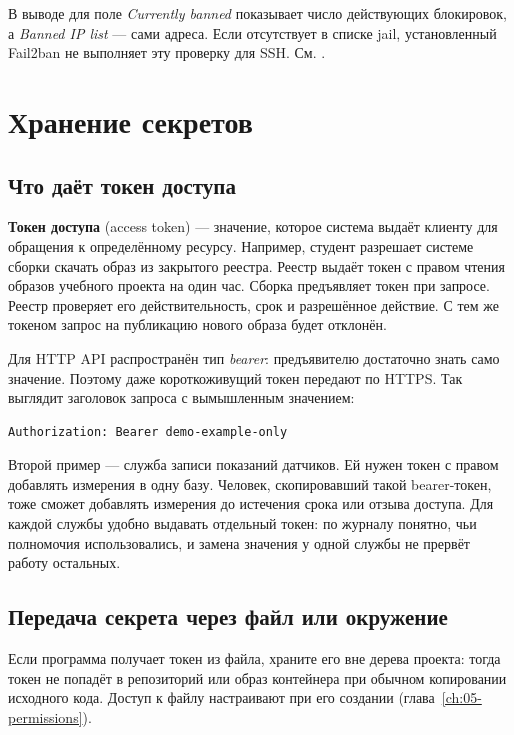 В выводе для  поле \emph{Currently banned} показывает число
действующих блокировок, а \emph{Banned IP list} --- сами адреса.
Если  отсутствует в списке jail, установленный Fail2ban
не выполняет эту проверку для SSH. См. .

\section{Хранение секретов}

\subsection{Что даёт токен доступа}

\textbf{Токен доступа} (access token) --- значение, которое система
выдаёт клиенту для обращения к определённому ресурсу. Например, студент
разрешает системе сборки скачать образ из закрытого реестра. Реестр
выдаёт токен с правом чтения образов учебного проекта на один час.
Сборка предъявляет токен при запросе. Реестр проверяет его действительность,
срок и разрешённое действие. С тем же токеном запрос на публикацию
нового образа будет отклонён.

Для HTTP API распространён тип \emph{bearer}: предъявителю достаточно
знать само значение. Поэтому даже короткоживущий токен передают по HTTPS.
Так выглядит заголовок запроса с вымышленным значением:

\begin{verbatim}
Authorization: Bearer demo-example-only
\end{verbatim}

Второй пример --- служба записи показаний датчиков. Ей нужен токен
с правом добавлять измерения в одну базу. Человек, скопировавший такой
bearer-токен, тоже сможет добавлять измерения до истечения срока или
отзыва доступа. Для каждой службы удобно выдавать отдельный токен:
по журналу понятно, чьи полномочия использовались, и замена значения
у одной службы не прервёт работу остальных.

\subsection{Передача секрета через файл или окружение}

Если программа получает токен из файла, храните его вне дерева проекта:
тогда токен не попадёт в репозиторий или образ контейнера при обычном
копировании исходного кода. Доступ к файлу настраивают при его создании
(глава~\ref{ch:05-permissions}).

